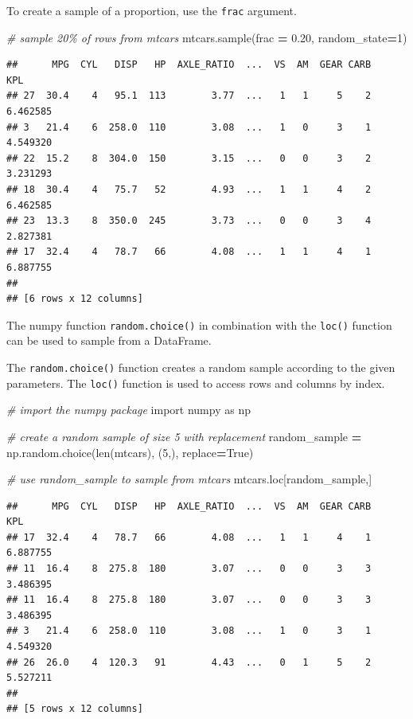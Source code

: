 \documentclass[
]{book}
\newenvironment{Shaded}{\begin{snugshade}}{\end{snugshade}}
\newcommand{\BuiltInTok}[1]{#1}
\newcommand{\CommentTok}[1]{\textcolor[rgb]{0.56,0.35,0.01}{\textit{#1}}}
\newcommand{\DecValTok}[1]{\textcolor[rgb]{0.00,0.00,0.81}{#1}}
\newcommand{\FloatTok}[1]{\textcolor[rgb]{0.00,0.00,0.81}{#1}}
\newcommand{\ImportTok}[1]{#1}
\newcommand{\NormalTok}[1]{#1}
\newcommand{\OperatorTok}[1]{\textcolor[rgb]{0.81,0.36,0.00}{\textbf{#1}}}
\newcommand{\VariableTok}[1]{\textcolor[rgb]{0.00,0.00,0.00}{#1}}
\begin{document}
To create a sample of a proportion, use the \texttt{frac} argument.

\begin{Shaded}
\begin{Highlighting}[]
\CommentTok{\# sample 20\% of rows from mtcars}
\NormalTok{mtcars.sample(frac }\OperatorTok{=} \FloatTok{0.20}\NormalTok{, random\_state}\OperatorTok{=}\DecValTok{1}\NormalTok{)}
\end{Highlighting}
\end{Shaded}

\begin{verbatim}
##      MPG  CYL   DISP   HP  AXLE_RATIO  ...  VS  AM  GEAR CARB       KPL
## 27  30.4    4   95.1  113        3.77  ...   1   1     5    2  6.462585
## 3   21.4    6  258.0  110        3.08  ...   1   0     3    1  4.549320
## 22  15.2    8  304.0  150        3.15  ...   0   0     3    2  3.231293
## 18  30.4    4   75.7   52        4.93  ...   1   1     4    2  6.462585
## 23  13.3    8  350.0  245        3.73  ...   0   0     3    4  2.827381
## 17  32.4    4   78.7   66        4.08  ...   1   1     4    1  6.887755
## 
## [6 rows x 12 columns]
\end{verbatim}

The numpy function \texttt{random.choice()} in combination with the \texttt{loc()} function can be used to sample from a DataFrame.

The \texttt{random.choice()} function creates a random sample according to the given parameters. The \texttt{loc()} function is used to access rows and columns by index.

\begin{Shaded}
\begin{Highlighting}[]
\CommentTok{\# import the numpy package}
\ImportTok{import}\NormalTok{ numpy }\ImportTok{as}\NormalTok{ np}

\CommentTok{\# create a random sample of size 5 with replacement}
\NormalTok{random\_sample }\OperatorTok{=}\NormalTok{ np.random.choice(}\BuiltInTok{len}\NormalTok{(mtcars), (}\DecValTok{5}\NormalTok{,), replace}\OperatorTok{=}\VariableTok{True}\NormalTok{)}

\CommentTok{\# use random\_sample to sample from mtcars}
\NormalTok{mtcars.loc[random\_sample,]}
\end{Highlighting}
\end{Shaded}

\begin{verbatim}
##      MPG  CYL   DISP   HP  AXLE_RATIO  ...  VS  AM  GEAR CARB       KPL
## 17  32.4    4   78.7   66        4.08  ...   1   1     4    1  6.887755
## 11  16.4    8  275.8  180        3.07  ...   0   0     3    3  3.486395
## 11  16.4    8  275.8  180        3.07  ...   0   0     3    3  3.486395
## 3   21.4    6  258.0  110        3.08  ...   1   0     3    1  4.549320
## 26  26.0    4  120.3   91        4.43  ...   0   1     5    2  5.527211
## 
## [5 rows x 12 columns]
\end{verbatim}
\end{document}

